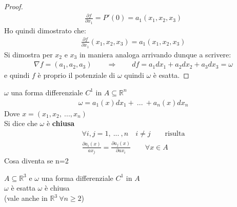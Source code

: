 \documentclass[a4paper, oneside]{article}
\newcommand\de{\partial}
\begin{document}
\begin{proof}
    \begin{gather*}
        \frac{\de f}{\de x_1} = P'(0) = a_1(x_1,x_2,x_3)
    \end{gather*}
    Ho quindi dimostrato che:
    \begin{gather*}
        \frac{\partial f}{\partial x_1} (x_1,x_2,x_3) = a_1(x_1,x_2,x_3)
    \end{gather*}
    Si dimostra per $x_2$ e $x_3$ in maniera analoga arrivando dunque a scrivere:
    \begin{gather*}
        \nabla f = (a_1,a_2,a_3) \qquad \Rightarrow \qquad df = a_1 dx_1 + a_2 dx_2 + a_3 dx_3 = \omega
    \end{gather*}
    e quindi $f$ è proprio il potenziale di $\omega$ quindi $\omega$ è esatta.
\end{proof}


\begin{proposition}
     $\omega$ una forma differenziale $C^1$ in $A \subseteq \mathbb{R}^n$
    \begin{gather*}
        \omega = a_1(x) dx_1 + \ ... \ + a_n(x) dx_n
    \end{gather*}
    Dove $x= (x_1,x_2, \ ... , x_n)$\\
    Si dice che $\omega$ è \textbf{chiusa} 
    \begin{gather*}
        \forall i,j = 1, \ ... \ ,n \quad i \neq j \qquad \text{risulta}\\
        \frac{\partial a_i(x)}{ax_j} = \frac{\partial a_j(x)}{\partial ax_i} \qquad \forall x \in A
    \end{gather*}
    Cosa diventa se n=2\\
    \end{proposition}


\begin{theorem}
     $A \subseteq \mathbb{R}^3$ e $\omega$ una forma differenziale $C^1$ in $A$ \\
     $\omega$ è esatta  $\omega$ è chiusa\\
    (vale anche in $\mathbb{R}^3 \ \forall n \geq 2$)
\end{theorem}
\end{document}
